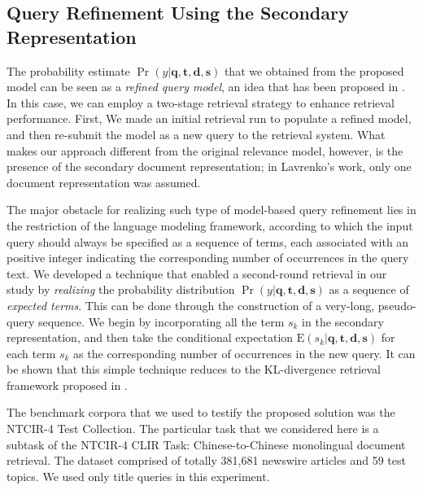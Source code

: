 \subsection{Query Refinement Using the Secondary
Representation}\label{s:query-modeling}

The probability estimate $\Pr(y|\mathbf{q}, \mathbf{t}, \mathbf{d},
\mathbf{s})$ that we obtained from the proposed model can be seen as a
\emph{refined query model}, an idea that has been proposed in
\cite{lavrenko2001relevance}.  In this case, we can employ a two-stage
retrieval strategy to enhance retrieval performance.  First, We made an initial
retrieval run to populate a refined model, and then re-submit the model as a
new query to the retrieval system.  What makes our approach different from the
original relevance model, however, is the presence of the secondary document
representation; in Lavrenko's work, only one document
representation was assumed.

The major obstacle for realizing such type of model-based query refinement lies
in the restriction of the language modeling framework, according to which the
input query should always be specified as a sequence of terms, each associated
with an positive integer indicating the corresponding number of occurrences in
the query text.  We developed a technique that enabled a second-round retrieval
in our study by \emph{realizing} the probability distribution
$\Pr(y|\mathbf{q}, \mathbf{t}, \mathbf{d}, \mathbf{s})$ as a sequence of
\emph{expected terms}.  This can be done through the construction of a
very-long, pseudo-query sequence.  We begin by incorporating all the term $s_k$
in the secondary representation, and then take the conditional expectation
$\mathrm{E}(s_k|\mathbf{q}, \mathbf{t}, \mathbf{d}, \mathbf{s})$ for each term
$s_k$ as the corresponding number of occurrences in the new query.  It can be
shown that this simple technique reduces to the KL-divergence retrieval
framework proposed in \cite{zhai2001language}. 

The benchmark corpora that we used to testify the proposed solution was the
NTCIR-4 Test Collection.  The particular task that we considered here is a
subtask of the NTCIR-4 CLIR Task: Chinese-to-Chinese monolingual document
retrieval.  The dataset comprised of totally 381,681 newswire articles and 59
test topics.  We used only title queries in this experiment.

